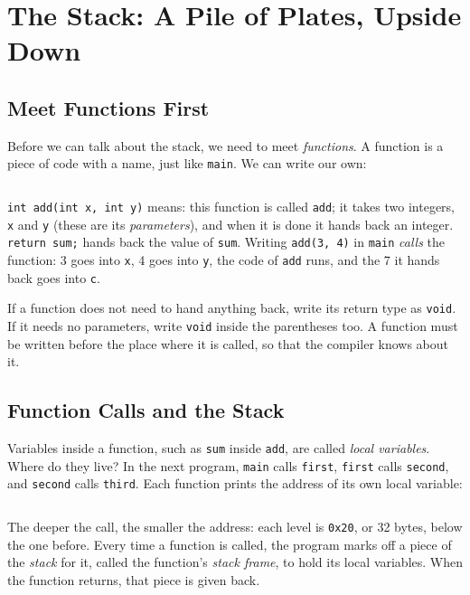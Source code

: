 \section{The Stack: A Pile of Plates, Upside Down}
\label{sec:stack}

\subsection{Meet Functions First}

Before we can talk about the stack, we need to meet \emph{functions}. A function is a piece of code with a name, just like \texttt{main}. We can write our own:


\inputminted[linenos=false]{text}{code/en/ch04/out/func.txt}

\texttt{int add(int x, int y)} means: this function is called \texttt{add}; it takes two integers, \texttt{x} and \texttt{y} (these are its \emph{parameters}), and when it is done it hands back an integer. \texttt{return sum;} hands back the value of \texttt{sum}. Writing \texttt{add(3, 4)} in \texttt{main} \emph{calls} the function: 3 goes into \texttt{x}, 4 goes into \texttt{y}, the code of \texttt{add} runs, and the 7 it hands back goes into \texttt{c}.

If a function does not need to hand anything back, write its return type as \texttt{void}. If it needs no parameters, write \texttt{void} inside the parentheses too. A function must be written before the place where it is called, so that the compiler knows about it.

\subsection{Function Calls and the Stack}

Variables inside a function, such as \texttt{sum} inside \texttt{add}, are called \emph{local variables}. Where do they live? In the next program, \texttt{main} calls \texttt{first}, \texttt{first} calls \texttt{second}, and \texttt{second} calls \texttt{third}. Each function prints the address of its own local variable:


\inputminted[linenos=false]{text}{code/en/ch04/out/stack.txt}

The deeper the call, the smaller the address: each level is \texttt{0x20}, or 32 bytes, below the one before. Every time a function is called, the program marks off a piece of the \emph{stack} for it, called the function's \emph{stack frame}, to hold its local variables. When the function returns, that piece is given back.

